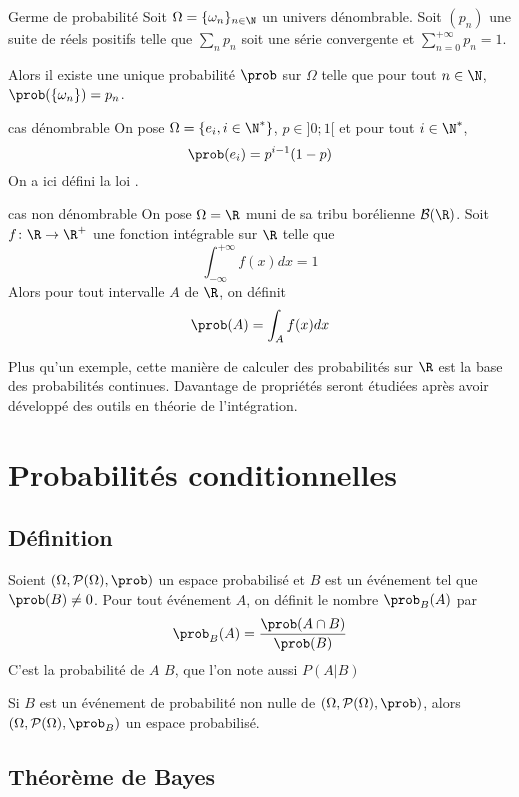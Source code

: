 \begin{theoreme}{Germe de probabilité}{}
	Soit $\Omega=\{\omega_n\}_{n \in \N}$ un univers dénombrable. Soit $(p_n)$ une suite de réels positifs telle que $\sum_n p_n$ soit une série convergente et $\sum\limits_{n=0}^{+\infty} p_n= 1$. 
	
	Alors il existe une unique probabilité $\prob$ sur $\Omega$ telle que pour tout $n \in \N $, $\prob(\{\omega_n\})=p_n$.
\end{theoreme}
\begin{exemple}{cas dénombrable}{}
	On pose $\Omega=\{e_i,i\in \N^*\}$, $p \in ]0;1[$ et pour tout $i \in \N^*$, $$\prob(e_i)=p^{i-1}(1-p)$$ On a ici défini la loi .
\end{exemple}

\begin{exemple}{cas non dénombrable}{}
  On pose $\Omega = \R$ muni de sa tribu borélienne $\mathcal{B}(\R)$. Soit $f \colon \R \to \R^+$ une fonction intégrable sur $\R $ telle que 
  $$\int_{-\infty}^{+\infty} f(x)dx = 1$$
  Alors pour tout intervalle $A$ de $\R$, on définit 
  $$\prob(A)=\int_A f(x)dx$$
\end{exemple}

Plus qu'un exemple, cette manière de calculer des probabilités sur $\R$ est la base des probabilités continues. Davantage de propriétés seront étudiées après avoir développé des outils en théorie de l'intégration.

\section{Probabilités conditionnelles}
\subsection{Définition}
Soient $(\Omega,\mathcal{P}(\Omega),\prob)$ un espace probabilisé et $B$ est un événement tel que $\prob(B) \neq 0$. Pour tout événement $A$, on définit le nombre $\prob_B(A)$ par 
$$\prob_B(A)=\frac{\prob(A \cap B)}{\prob(B)}$$
C'est la probabilité  de $A$  $B$, que l'on note aussi $P(A|B)$

\begin{proposition}{}{}
	Si $B$ est un événement de probabilité non nulle de $(\Omega,\mathcal{P}(\Omega),\prob)$, alors  $(\Omega,\mathcal{P}(\Omega),\prob_B)$ un espace probabilisé.
\end{proposition}

\subsection{Théorème de Bayes}

